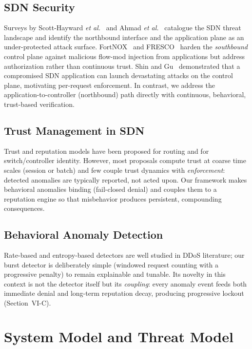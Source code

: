 \documentclass[journal]{IEEEtran}
\begin{document}
\subsection{SDN Security}
Surveys by Scott-Hayward \emph{et al.}~\cite{survey16} and Ahmad \emph{et al.}~\cite{ahmad} catalogue the SDN threat landscape and identify the northbound interface and the application plane as an under-protected attack surface. FortNOX~\cite{fortnox} and FRESCO~\cite{fresco} harden the \emph{southbound} control plane against malicious flow-mod injection from applications but address authorization rather than continuous trust. Shin and Gu~\cite{attack} demonstrated that a compromised SDN application can launch devastating attacks on the control plane, motivating per-request enforcement. In contrast, we address the application-to-controller (northbound) path directly with continuous, behavioral, trust-based verification.

\subsection{Trust Management in SDN}
Trust and reputation models have been proposed for routing and for switch/controller identity. However, most proposals compute trust at coarse time scales (session or batch) and few couple trust dynamics with \emph{enforcement}: detected anomalies are typically reported, not acted upon. Our framework makes behavioral anomalies binding (fail-closed denial) and couples them to a reputation engine so that misbehavior produces persistent, compounding consequences.

\subsection{Behavioral Anomaly Detection}
Rate-based and entropy-based detectors are well studied in DDoS literature; our burst detector is deliberately simple (windowed request counting with a progressive penalty) to remain explainable and tunable. Its novelty in this context is not the detector itself but its \emph{coupling}: every anomaly event feeds both immediate denial and long-term reputation decay, producing progressive lockout (Section~VI-C).

\section{System Model and Threat Model}
\end{document}
